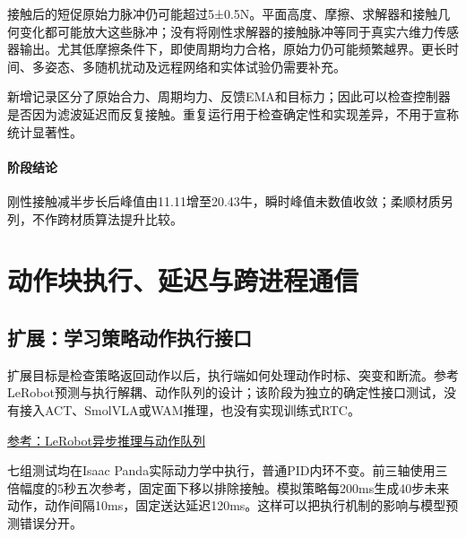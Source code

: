 接触后的短促原始力脉冲仍可能超过5±0.5N。平面高度、摩擦、求解器和接触几何变化都可能放大这些脉冲；没有将刚性求解器的接触脉冲等同于真实六维力传感器输出。尤其低摩擦条件下，即使周期均力合格，原始力仍可能频繁越界。更长时间、多姿态、多随机扰动及远程网络和实体试验仍需要补充。

新增记录区分了原始合力、周期均力、反馈EMA和目标力；因此可以检查控制器是否因为滤波延迟而反复接触。重复运行用于检查确定性和实现差异，不用于宣称统计显著性。


\paragraph{阶段结论}刚性接触减半步长后峰值由11.11增至20.43牛，瞬时峰值未数值收敛；柔顺材质另列，不作跨材质算法提升比较。


\FloatBarrier

\section{动作块执行、延迟与跨进程通信}

\label{stage:s16}

\subsection{扩展：学习策略动作执行接口}\label{s16-detail-1}

扩展目标是检查策略返回动作以后，执行端如何处理动作时标、突变和断流。参考LeRobot预测与执行解耦、动作队列的设计；该阶段为独立的确定性接口测试，没有接入ACT、SmolVLA或WAM推理，也没有实现训练式RTC。

\href{https://huggingface.co/docs/lerobot/async}{参考：LeRobot异步推理与动作队列}

七组测试均在Isaac Panda实际动力学中执行，普通PID内环不变。前三轴使用三倍幅度的5秒五次参考，固定面下移以排除接触。模拟策略每200ms生成40步未来动作，动作间隔10ms，固定送达延迟120ms。这样可以把执行机制的影响与模型预测错误分开。

